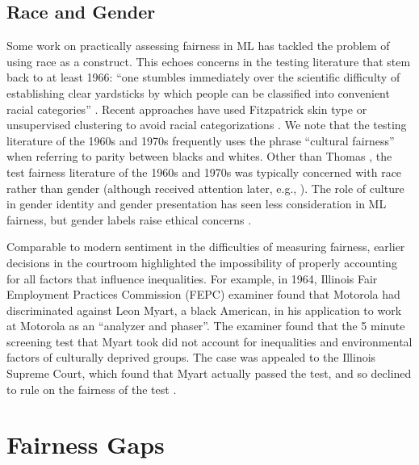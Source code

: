 \documentclass[sigconf,letterpaper,9pt]{acmart}
\begin{document}
\subsection{Race and Gender}
Some work on practically assessing fairness in ML has tackled the problem of using
race as a construct. This echoes concerns in the testing literature that stem back
to at least 1966: ``one stumbles immediately over the scientific difficulty of establishing clear yardsticks by which people can be classified into convenient racial categories''
\cite{guion1966employment}. Recent approaches have used Fitzpatrick skin type or unsupervised clustering to avoid racial categorizations \cite{buolamwini2018gender, ryuinclusivefacenet}.
We note that the testing literature of the 1960s and 1970s frequently uses the phrase
``cultural fairness'' when referring to parity between blacks and whites.
Other than Thomas \cite{thomas1973overprediction}, the test fairness 
literature of the 1960s and 1970s was typically concerned with race
rather than gender (although received attention later, e.g., \cite{willingham2013gender}). 
The role of culture in gender identity and gender presentation
has seen less consideration in ML fairness, but gender
labels raise ethical concerns \cite{hoffmann2017data, hamidi2018gender}.

Comparable to modern sentiment in the difficulties of measuring fairness, earlier decisions in the courtroom highlighted the impossibility of properly accounting for all factors that influence inequalities.  For example, in 1964, Illinois Fair Employment Practices Commission (FEPC) examiner found that Motorola had discriminated against Leon Myart, a black American, 
in his application to work at Motorola as an ``analyzer and phaser''. The examiner found that the 5 minute screening test that Myart took did not
account for inequalities and environmental factors of culturally deprived groups. The case was appealed to the Illinois Supreme Court, which found that
Myart actually passed the test, and so declined
to rule on the fairness of the test \cite{ash1966implications}.

\section{Fairness Gaps}\label{sec:gaps}
\end{document}
